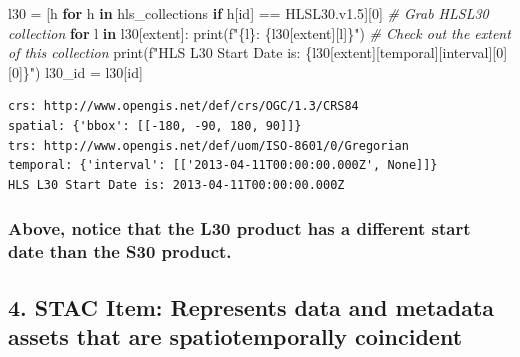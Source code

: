 \documentclass[
  letterpaper,
]{scrartcl}
\newenvironment{Shaded}{}{}
\newcommand{\BuiltInTok}[1]{#1}
\newcommand{\CommentTok}[1]{\textcolor[rgb]{0.38,0.63,0.69}{\textit{#1}}}
\newcommand{\ControlFlowTok}[1]{\textcolor[rgb]{0.00,0.44,0.13}{\textbf{#1}}}
\newcommand{\DecValTok}[1]{\textcolor[rgb]{0.25,0.63,0.44}{#1}}
\newcommand{\KeywordTok}[1]{\textcolor[rgb]{0.00,0.44,0.13}{\textbf{#1}}}
\newcommand{\NormalTok}[1]{#1}
\newcommand{\OperatorTok}[1]{\textcolor[rgb]{0.40,0.40,0.40}{#1}}
\newcommand{\SpecialCharTok}[1]{\textcolor[rgb]{0.25,0.44,0.63}{#1}}
\newcommand{\SpecialStringTok}[1]{\textcolor[rgb]{0.73,0.40,0.53}{#1}}
\newcommand{\StringTok}[1]{\textcolor[rgb]{0.25,0.44,0.63}{#1}}
\begin{document}
\begin{Shaded}
\begin{Highlighting}[]
\NormalTok{l30 }\OperatorTok{=}\NormalTok{ [h }\ControlFlowTok{for}\NormalTok{ h }\KeywordTok{in}\NormalTok{ hls\_collections }\ControlFlowTok{if}\NormalTok{ h[}\StringTok{\textquotesingle{}id\textquotesingle{}}\NormalTok{] }\OperatorTok{==} \StringTok{\textquotesingle{}HLSL30.v1.5\textquotesingle{}}\NormalTok{][}\DecValTok{0}\NormalTok{]     }\CommentTok{\# Grab HLSL30 collection}
\ControlFlowTok{for}\NormalTok{ l }\KeywordTok{in}\NormalTok{ l30[}\StringTok{\textquotesingle{}extent\textquotesingle{}}\NormalTok{]: }\BuiltInTok{print}\NormalTok{(}\SpecialStringTok{f"}\SpecialCharTok{\{l\}}\SpecialStringTok{: }\SpecialCharTok{\{}\NormalTok{l30[}\StringTok{\textquotesingle{}extent\textquotesingle{}}\NormalTok{][l]}\SpecialCharTok{\}}\SpecialStringTok{"}\NormalTok{)             }\CommentTok{\# Check out the extent of this collection}
\BuiltInTok{print}\NormalTok{(}\SpecialStringTok{f"HLS L30 Start Date is: }\SpecialCharTok{\{}\NormalTok{l30[}\StringTok{\textquotesingle{}extent\textquotesingle{}}\NormalTok{][}\StringTok{\textquotesingle{}temporal\textquotesingle{}}\NormalTok{][}\StringTok{\textquotesingle{}interval\textquotesingle{}}\NormalTok{][}\DecValTok{0}\NormalTok{][}\DecValTok{0}\NormalTok{]}\SpecialCharTok{\}}\SpecialStringTok{"}\NormalTok{)}
\NormalTok{l30\_id }\OperatorTok{=}\NormalTok{ l30[}\StringTok{\textquotesingle{}id\textquotesingle{}}\NormalTok{]}
\end{Highlighting}
\end{Shaded}

\begin{verbatim}
crs: http://www.opengis.net/def/crs/OGC/1.3/CRS84
spatial: {'bbox': [[-180, -90, 180, 90]]}
trs: http://www.opengis.net/def/uom/ISO-8601/0/Gregorian
temporal: {'interval': [['2013-04-11T00:00:00.000Z', None]]}
HLS L30 Start Date is: 2013-04-11T00:00:00.000Z
\end{verbatim}

\hypertarget{above-notice-that-the-l30-product-has-a-different-start-date-than-the-s30-product.}{%
\subsubsection{Above, notice that the L30 product has a different start
date than the S30
product.}\label{above-notice-that-the-l30-product-has-a-different-start-date-than-the-s30-product.}}

\hypertarget{stac-item-represents-data-and-metadata-assets-that-are-spatiotemporally-coincident}{%
\subsection{4. STAC Item: Represents data and metadata assets that are
spatiotemporally
coincident}\label{stac-item-represents-data-and-metadata-assets-that-are-spatiotemporally-coincident}}
\end{document}
